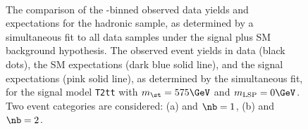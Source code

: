 \begin{figure}[t!]
  \begin{center}
     \\
    \caption{\label{fig:t2cc-best-fit}The comparison of
      the \scalht-binned observed data yields and expectations for the
      hadronic sample, as determined by a simultaneous fit to all data
      samples under the signal plus SM background hypothesis. The
      observed event yields in data (black dots), the SM expectations
      (dark blue solid line), and the signal expectations (pink solid
      line), as determined by the simultaneous fit, for the
      signal model \texttt{T2tt} with $m_{\st} = 575\GeV$ and
      $m_{\text{LSP}} = 0\GeV$. Two event categories are
      considered: (a) \njethigh and $\nb = 1$, (b) \njethigh and
      $\nb = 2$.}
  \end{center}
\end{figure}
